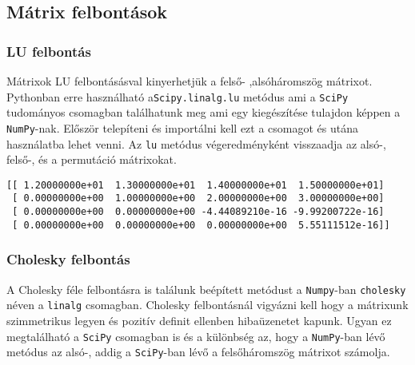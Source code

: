     \subsection{Mátrix felbontások}\label{muxe1trix-felbontuxe1sok}

    \subsubsection{LU felbontás}\label{lu-felbontuxe1s}

    Mátrixok LU felbontásásval kinyerhetjük a felső- ,alsóháromszög
mátrixot. Pythonban erre használható a\texttt{Scipy.linalg.lu} metódus
ami a \texttt{SciPy} tudományos csomagban találhatunk meg ami egy
kiegészítése tulajdon képpen a \texttt{NumPy}-nak. Először telepíteni és
importálni kell ezt a csomagot és utána használatba lehet venni. Az
\texttt{lu} metódus végeredményként visszaadja az alsó-, felső-, és a
permutáció mátrixokat.

\begin{python}

\end{python}

    \begin{verbatim}
[[ 1.20000000e+01  1.30000000e+01  1.40000000e+01  1.50000000e+01]
 [ 0.00000000e+00  1.00000000e+00  2.00000000e+00  3.00000000e+00]
 [ 0.00000000e+00  0.00000000e+00 -4.44089210e-16 -9.99200722e-16]
 [ 0.00000000e+00  0.00000000e+00  0.00000000e+00  5.55111512e-16]]
    \end{verbatim}

    \subsubsection{Cholesky felbontás}\label{cholesky-felbontuxe1s}

    A Cholesky féle felbontásra is találunk beépített metódust a
\texttt{Numpy}-ban \texttt{cholesky} néven a \texttt{linalg} csomagban.
Cholesky felbontásnál vigyázni kell hogy a mátrixunk szimmetrikus legyen
és pozitív definit ellenben hibaüzenetet kapunk. Ugyan ez megtalálható a
\texttt{SciPy} csomagban is és a különbség az, hogy a \texttt{NumPy}-ban
lévő metódus az alsó-, addig a \texttt{SciPy}-ban lévő a felsőháromszög
mátrixot számolja.

\begin{python}

\end{python}

\begin{python}

\end{python}


